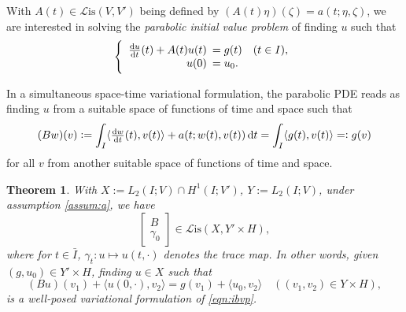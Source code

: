 \documentclass[11pt,a4paper,oneside,english]{amsart}
\numberwithin{equation}{section}
\newtheorem{theorem}{Theorem}
\numberwithin{theorem}{section}
\theoremstyle{definition}
\newcommand{\la}{\langle}
\newcommand{\ra}{\rangle}
\newcommand{\cL}{\mathcal L}
\newcommand{\Lis}{\cL\mathrm{is}}
\begin{document}
With $A(t) \in \Lis({V},V')$ being defined by $ (A(t) \eta)(\zeta)=a(t;\eta,\zeta)$,
we are interested in solving the {\em parabolic initial value problem} of finding
$u$ such that
\begin{equation}
  \label{eqn:ibvp}
  \left\{
    \begin{array}{rl}
      \frac{\dif u}{\dif t}(t) +A(t) u(t)&\!\!\!= g(t) \quad(t \in I),\\
      u(0) &\!\!\!= u_0.
    \end{array}
  \right.
\end{equation}

In a simultaneous space-time variational formulation, the parabolic PDE reads as
finding $u$ from a suitable space of functions of time and space such that
\begin{equation}
  \label{eqn:B-var-form}
  (Bw)(v):=\int_I \la \tfrac{\dif w}{\dif t}(t), v(t) \ra + a(t;w(t),v(t)) \dif t = \int_I \la g(t), v(t) \ra =:g(v)
\end{equation}
for all $v$ from another suitable space of functions of time and space.

\begin{theorem}
  \label{thm:varform}
  With $X:=L_2(I;{V}) \cap H^1(I;V')$, $Y:=L_2(I;{V})$, under assumption \ref{assum:a}, we have
  \begin{equation}
    \label{eqn:B-lis}
    \begin{bmatrix} B \\ \gamma_0\end{bmatrix}\in \Lis(X,Y' \times H),
  \end{equation}
  where for $t \in \bar I$, $\gamma_t\colon u \mapsto u(t,\cdot)$ denotes the trace map.
  In other words, given $(g, u_0) \in Y' \times H$, finding $u \in X$ such that
  \begin{equation}
    \label{eqn:B-varform}
    (Bu)(v_1)+\la u(0,\cdot),v_2\ra=g(v_1)+\la u_0,v_2\ra\quad ((v_1,v_2) \in Y \times H),
  \end{equation}
  is a well-posed variational formulation of \eqref{eqn:ibvp}.
\end{theorem}
\end{document}
